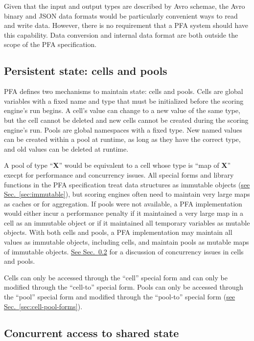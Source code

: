 \documentclass{article}
\newcommand{\PFAtp}{\ttfamily\bfseries}
\theoremstyle{definition}
\begin{document}
Given that the input and output types are described by Avro schemae, the Avro binary and JSON data formats would be particularly convenient ways to read and write data.  However, there is no requirement that a PFA system should have this capability.  Data conversion and internal data format are both outside the scope of the PFA specification.

\hypertarget{hsec:state}{}
\subsection{Persistent state: cells and pools}
\label{sec:state}

PFA defines two mechanisms to maintain state: cells and pools.  Cells are global variables with a fixed name and type that must be initialized before the scoring engine's run begins.  A cell's value can change to a new value of the same type, but the cell cannot be deleted and new cells cannot be created during the scoring engine's run.  Pools are global namespaces with a fixed type.  New named values can be created within a pool at runtime, as long as they have the correct type, and old values can be deleted at runtime.

A pool of type ``{\PFAtp X}'' would be equivalent to a cell whose type is ``map of {\PFAtp X}'' execpt for performance and concurrency issues.  All special forms and library functions in the PFA specification treat data structures as immutable objects (\hyperlink{hsec:immutable}{see Sec.~\ref{sec:immutable}}), but scoring engines often need to maintain very large maps as caches or for aggregation.  If pools were not available, a PFA implementation would either incur a performance penalty if it maintained a very large map in a cell as an immutable object or if it maintained all temporary variables as mutable objects.  With both cells and pools, a PFA implementation may maintain all values as immutable objects, including cells, and maintain pools as mutable maps of immutable objects.  \hyperlink{hsec:concurrent}{See Sec.~\ref{sec:concurrent}} for a discussion of concurrency issues in cells and pools.

Cells can only be accessed through the ``cell'' special form and can only be modified through the ``cell-to'' special form.  Pools can only be accessed through the ``pool'' special form and modified through the ``pool-to'' special form (\hyperlink{hsec:cell-pool-forms}{see Sec.~\ref{sec:cell-pool-forms}}).

\hypertarget{hsec:concurrent}{}
\subsection{Concurrent access to shared state}
\label{sec:concurrent}
\end{document}
